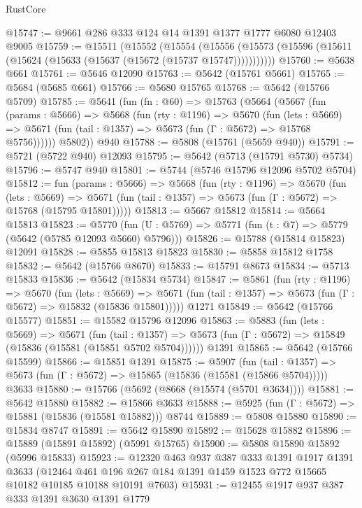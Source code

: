 \begin{lexlean}{RustCore}
\begin{coremodule}
@15747 := @9661 @286 @333 @124 @14 @1391 @1377 @1777 @6080 @12403 @9005
@15759 := @15511
    (@15552
      (@15554
        (@15556 (@15573 (@15596 (@15611 (@15624 (@15633 (@15637 (@15672 (@15737 @15747)))))))))))
@15760 := @5638 @661
@15761 := @5646 @12090
@15763 := @5642 (@15761 @5661)
@15765 := @5684 (@5685 @661)
@15766 := @5680 @15765
@15768 := @5642 (@15766 @5709)
@15785 := @5641
    (fun (fn : @60) =>
    @15763
      (@5664
        (@5667
          (fun (params : @5666) =>
          @5668
            (fun (rty : @1196) =>
            @5670
              (fun (lets : @5669) =>
              @5671 (fun (tail : @1357) => @5673 (fun (Γ : @5672) => @15768 @5756))))))
        @5802))
    @940
@15788 := @5808 (@15761 (@5659 @940))
@15791 := @5721 (@5722 @940) @12093
@15795 := @5642 (@5713 (@15791 @5730) @5734)
@15796 := @5747 @940
@15801 := @5744 (@5746 @15796 @12096 @5702 @5704)
@15812 := fun (params : @5666) =>
  @5668
    (fun (rty : @1196) =>
    @5670
      (fun (lets : @5669) =>
      @5671 (fun (tail : @1357) => @5673 (fun (Γ : @5672) => @15768 (@15795 @15801)))))
@15813 := @5667 @15812
@15814 := @5664 @15813
@15823 := @5770
    (fun (U : @5769) => @5771 (fun (t : @7) => @5779 (@5642 (@5785 @12093 @5660) @5796)))
@15826 := @15788 (@15814 @15823) @12091
@15828 := @5855 @15813 @15823
@15830 := @5858 @15812 @1758
@15832 := @5642 (@15766 @8670)
@15833 := @15791 @8673
@15834 := @5713 @15833
@15836 := @5642 (@15834 @5734)
@15847 := @5861
    (fun (rty : @1196) =>
    @5670
      (fun (lets : @5669) =>
      @5671 (fun (tail : @1357) => @5673 (fun (Γ : @5672) => @15832 (@15836 @15801)))))
    @1271
@15849 := @5642 (@15766 @15577)
@15851 := @15582 @15796 @12096
@15863 := @5883
    (fun (lets : @5669) =>
    @5671
      (fun (tail : @1357) =>
      @5673 (fun (Γ : @5672) => @15849 (@15836 (@15581 (@15851 @5702 @5704))))))
    @1391
@15865 := @5642 (@15766 @15599)
@15866 := @15851 @1391
@15875 := @5907
    (fun (tail : @1357) => @5673 (fun (Γ : @5672) => @15865 (@15836 (@15581 (@15866 @5704)))))
    @3633
@15880 := @15766 (@5692 (@8668 (@15574 (@5701 @3634))))
@15881 := @5642 @15880
@15882 := @15866 @3633
@15888 := @5925 (fun (Γ : @5672) => @15881 (@15836 (@15581 @15882))) @8744
@15889 := @5808 @15880
@15890 := @15834 @8747
@15891 := @5642 @15890
@15892 := @15628 @15882
@15896 := @15889 (@15891 @15892) (@5991 @15765)
@15900 := @5808 @15890 @15892 (@5996 @15833)
@15923 := @12320
    @463
    @937
    @387
    @333
    @1391
    @1917
    @1391
    @3633
    (@12464 @461 @196 @267 @184 @1391 @1459 @1523 @772 @15665 @10182 @10185 @10188 @10191 @7603)
@15931 := @12455 @1917 @937 @387 @333 @1391 @3630 @1391 @1779

\end{coremodule}
\end{lexlean}
